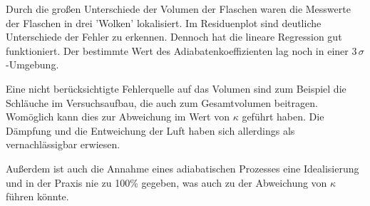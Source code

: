 \documentclass[a4paper, 11pt]{article}
\begin{document}
Durch die großen Unterschiede der Volumen der Flaschen waren die Messwerte der Flaschen in drei 'Wolken' lokalisiert. Im Residuenplot sind deutliche Unterschiede der Fehler zu erkennen. Dennoch hat die lineare Regression gut funktioniert. Der bestimmte Wert des Adiabatenkoeffizienten lag noch in einer $3 \,\sigma$-Umgebung.

Eine nicht berücksichtigte Fehlerquelle auf das Volumen sind zum Beispiel die Schläuche im Versuchsaufbau, die auch zum Gesamtvolumen beitragen. Womöglich kann dies zur Abweichung im Wert von $\kappa$ geführt haben. Die Dämpfung und die Entweichung der Luft haben sich allerdings als vernachlässigbar erwiesen.

Außerdem ist auch die Annahme eines adiabatischen Prozesses eine Idealisierung und in der Praxis nie zu 100\% gegeben, was auch zu der Abweichung von $\kappa$ führen könnte.






\listoffigures
\listoftables
\end{document}
